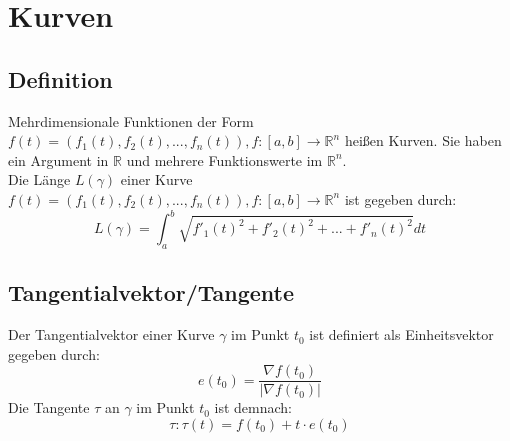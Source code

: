 
\section{Kurven}
\label{sec:kurven}

\subsection{Definition}
\label{sub:definition-kurven}

Mehrdimensionale Funktionen der Form $f(t) = (f_1(t),f_2(t),...,f_n(t)), f:[a,b] \rightarrow \mathbb{R}^n$ heißen Kurven.
Sie haben ein Argument in $\mathbb{R}$ und mehrere Funktionswerte im $\mathbb{R}^n$.
\\
Die Länge $L(\gamma)$ einer Kurve $f(t) = (f_1(t),f_2(t),...,f_n(t)), f:[a,b] \rightarrow \mathbb{R}^n$ ist gegeben durch:
\begin{equation}
	L(\gamma) = \int_a^b \sqrt{f'_1(t)^2 + f'_2(t)^2 + ... + f'_n(t)^2}dt
\end{equation}

\subsection{Tangentialvektor/Tangente}
\label{sub:tangentialvektor_tangente}

Der Tangentialvektor einer Kurve $\gamma$ im Punkt $t_0$ ist definiert als Einheitsvektor gegeben durch: 
\begin{equation}
	e(t_0) = \frac{\nabla f(t_0)}{|\nabla f(t_0)|}
\end{equation}
Die Tangente $\tau$ an $\gamma$ im Punkt $t_0$ ist demnach:
\begin{equation}
	\tau : \tau(t) = f(t_0) +  t \cdot e(t_0)
\end{equation}
